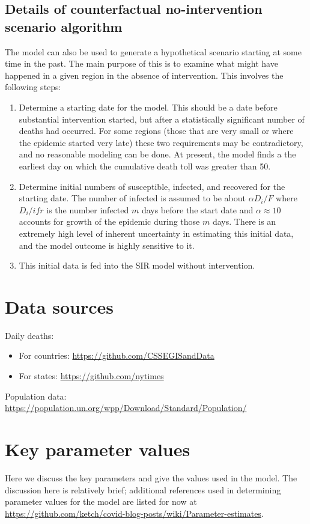\documentclass[english,12pt,letter]{article}
\newcommand{\ifr}{F}
\begin{document}
\subsection{Details of counterfactual no-intervention scenario algorithm}
The model can also be used to generate a hypothetical scenario starting at some time in the past.
The main purpose of this is to examine what might have happened in a given region in the absence
of intervention.  This involves the following steps:
\begin{enumerate}
    \item Determine a starting date for the model.  This should be a date before substantial
            intervention started, but after a statistically significant number of deaths
            had occurred.  For some regions (those that are very small or where the epidemic
            started very late) these two requirements may be contradictory, and no reasonable
            modeling can be done.  At present, the model finds a the earliest day on which
            the cumulative death toll was greater than 50.
    \item Determine initial numbers of susceptible, infected, and recovered for the starting
            date.  The number of infected is assumed to be about $\alpha D_i/\ifr$ where
            $D_i/ifr$ is the number infected $m$ days before the start date and
            $\alpha\approx 10$ accounts for growth of the epidemic during those $m$ days.
            There is an extremely high level of inherent uncertainty in estimating this initial data,
            and the model outcome is highly sensitive to it.
    \item This initial data is fed into the SIR model without intervention.
\end{enumerate}

\section{Data sources}
Daily deaths:
\begin{itemize}
    \item For countries: \url{https://github.com/CSSEGISandData}
    \item For states: \url{https://github.com/nytimes}
\end{itemize}

Population data: \url{https://population.un.org/wpp/Download/Standard/Population/}

\section{Key parameter values}
Here we discuss the key parameters and give the values used in the model.
The discussion here is relatively brief; additional references used in
determining parameter values for the model are listed for now at
\url{https://github.com/ketch/covid-blog-posts/wiki/Parameter-estimates}.
\end{document}
